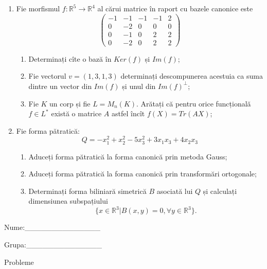 \documentclass{article}
\begin{document}
\begin{enumerate}
 \item Fie morfismul $f:\mathbb{R}^5 \to \mathbb{R}^4$ al cărui matrice în raport cu bazele canonice este
$$\begin{pmatrix}
-1&-1&-1&-1&2\\
0&-2&0&0&0\\
0&-1&0&2&2\\
0&-2&0&2&2
\end{pmatrix}$$

\begin{enumerate}
\item Determinați cîte o bază în $Ker(f)$ și $Im(f)$;
\item Fie vectorul $v=(1,3,1,3)$ determinați descompunerea acestuia ca suma dintre un vector din $Im(f)$ și unul din $Im(f)^\perp$;
\item Fie $K$ un corp și fie $L=M_n(K)$. Arătați că pentru orice funcțională $f \in L^*$ există o matrice $A$ astfel încît $f(X)=Tr(AX)$;
\end{enumerate}
\item Fie forma pătratică:
$$Q= -x_1^2+x_2^2-5x_3^2+3x_1x_3+4x_2x_3$$

\begin{enumerate}
\item Aduceți forma pătratică la forma canonică prin metoda Gauss;
\item Aduceți forma pătratică la forma canonică prin transformări ortogonale;
\item Determinați forma biliniară simetrică $B$ asociată lui $Q$ și calculați dimensiunea subspațiului
$$\{x \in \mathbb{R}^3 | B(x,y)=0,\forall y \in \mathbb{R}^3\}.$$

\end{enumerate}
\end{enumerate}
\newpage
\begin{flushright}
Nume:\_\_\_\_\_\_\_\_\_\_\_\_\_\_
 
 
Grupa:\_\_\_\_\_\_\_\_\_\_\_\_\_\_
\end{flushright}
\begin{center}
\vspace{2cm}
{\Large Probleme}
\vspace{2cm}
\end{center}
\end{document}
